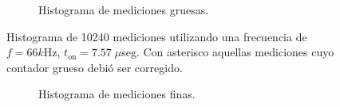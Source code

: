 \begin{figure}[H]
\begin{subfigure}[t]{0.45\textwidth}
{           }
           \caption{Histograma de mediciones gruesas.}
     \end{subfigure}
     \caption{Histograma de 10240 mediciones utilizando una frecuencia de $f=66k$Hz, $t_{\text{on}}=7.57 \; \mu$seg. 
     Con asterisco aquellas mediciones cuyo contador grueso debió ser corregido.}
\end{figure}

\begin{figure}[H]
     \centering
     \begin{subfigure}[t]{0.45\textwidth} %
           \centering
           \caption{Histograma de mediciones finas.}
           \label{fig: histograma_66}
     \end{subfigure}%
     \hspace{10pt}%
     \begin{subfigure}[t]{0.45\textwidth} %
           \centering
\end{subfigure}
\end{figure}
